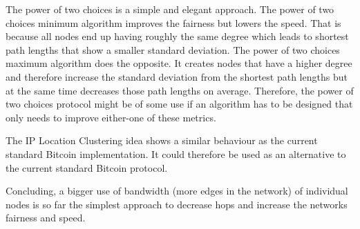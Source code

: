 \documentclass[a4paper, oneside]{discothesis}
\begin{document}
The power of two choices is a simple and elegant approach. The power of two choices minimum algorithm improves the fairness but lowers the speed. That is because all nodes end up having roughly the same degree which leads to shortest path lengths that show a smaller standard deviation.
The power of two choices maximum algorithm does the opposite. It creates nodes that have a higher degree and therefore increase the standard deviation from the shortest path lengths but at the same time decreases those path lengths on average.
Therefore, the power of two choices protocol might be of some use if an algorithm has to be designed that only needs to improve either-one of these metrics.

The IP Location Clustering idea shows a similar behaviour as the current standard Bitcoin implementation. It could therefore be used as an alternative to the current standard Bitcoin protocol.

Concluding, a bigger use of bandwidth (more edges in the network) of individual nodes is so far the simplest approach to decrease hops and increase the networks fairness and speed.




\end{document}

